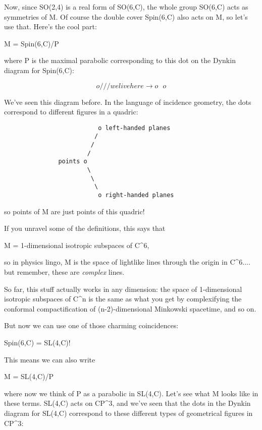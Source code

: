 Now, since SO(2,4) is a real form of SO(6,C), the whole group 
SO(6,C) acts as symmetries of M.  Of course the double cover 
Spin(6,C) also acts on M, so let's use that.  Here's the cool part:

M = Spin(6,C)/P 

where P is the maximal parabolic corresponding to this dot on
the Dynkin diagram for Spin(6,C):

$$
                          o
                         /
                        /
                       /
     we live here \to   o
                       \
                        \
                         \
                          o
$$
    
We've seen this diagram before.  In the language of incidence geometry,
the dots correspond to different figures in a quadric:


\begin{verbatim}
                          o left-handed planes
                         /
                        /
                       /
               points o 
                       \
                        \
                         \
                          o right-handed planes
\end{verbatim}
    
so points of M are just points of this quadric!

If you unravel some of the definitions, this says that

M = {1-dimensional isotropic subspaces of C^{6}},

so in physics lingo, M is the space of lightlike lines through the
origin in C^{6}.... but remember, these are \emph{complex} lines.

So far, this stuff actually works in any dimension: the space of 
1-dimensional isotropic subspaces of C^{n} is the same
as what you get by complexifying the conformal compactification of 
(n-2)-dimensional Minkowski spacetime, and so on.

But now we can use one of those charming coincidences:

Spin(6,C) = SL(4,C)!

This means we can also write

M = SL(4,C)/P

where now we think of P as a parabolic in SL(4,C).  Let's see
what M looks like in these terms.  SL(4,C) acts on CP^{3}, and
we've seen that the dots in the Dynkin diagram for SL(4,C) 
correspond to these different types of geometrical figures in CP^{3}:

